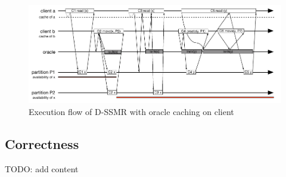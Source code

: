 \begin{figure}
\begin{minipage}[b]{1\linewidth} %
\centering
      \includegraphics[width=0.85\linewidth]{figures/cache}
\end{minipage}
\caption{Execution flow of D-SSMR with oracle caching on client}
\label{fig:cache}
\end{figure}

\subsection{Correctness}
\label{sec:correctness}
TODO: add content